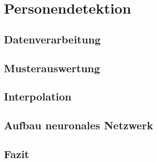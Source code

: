\chapter{Personendetektion}
\label{chap:Personendetektion}




\section{Datenverarbeitung}



\section{Musterauswertung}



\section{Interpolation}

\section{Aufbau neuronales Netzwerk}






\section{Fazit}